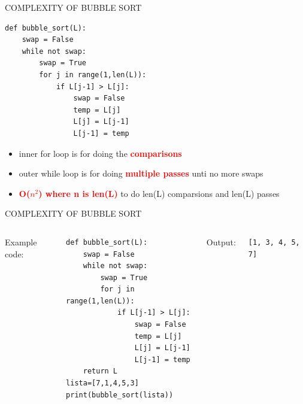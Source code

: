 \documentclass[aspectratio=169]{beamer}
\begin{document}
\begin{frame}[fragile]{COMPLEXITY OF BUBBLE SORT}
\begin{lstlisting}
def bubble_sort(L):
	swap = False
	while not swap:
		swap = True
		for j in range(1,len(L)):
			if L[j-1] > L[j]:
				swap = False
				temp = L[j]
				L[j] = L[j-1]
				L[j-1] = temp
\end{lstlisting}
\begin{itemize}
\item inner for loop is for doing the \textcolor{red}{\textbf{comparisons}}
\item outer while loop is for doing \textcolor{red}{\textbf{multiple passes}} unti no more swaps
\item \textcolor{red}{\textbf{O($n^2$) where n is len(L)}} to do len(L) comparsions and len(L) passes
\end{itemize}
\end{frame}

\begin{frame}[fragile]{COMPLEXITY OF BUBBLE SORT}
\begin{columns}
Example code:
\begin{lstlisting}
def bubble_sort(L):
    swap = False
    while not swap:
        swap = True
        for j in range(1,len(L)):
            if L[j-1] > L[j]:
                swap = False
                temp = L[j]
                L[j] = L[j-1]
                L[j-1] = temp
    return L    
lista=[7,1,4,5,3]
print(bubble_sort(lista))
\end{lstlisting}
Output:
\begin{block}{}
\begin{verbatim}
[1, 3, 4, 5, 7]
\end{verbatim}
\end{block}
\end{columns}
\end{frame}
\end{document}
